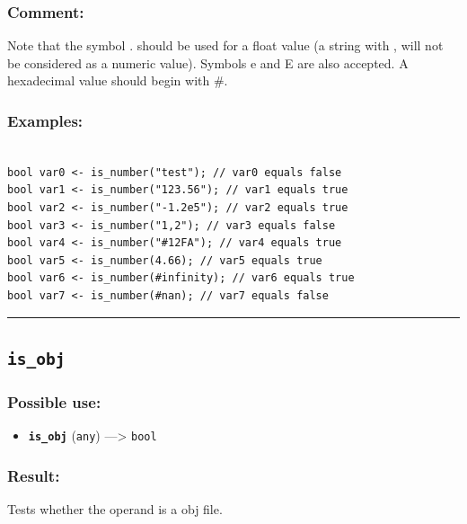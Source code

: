 \documentclass[]{book}
\providecommand{\tightlist}{%
  \setlength{\itemsep}{0pt}\setlength{\parskip}{0pt}}
\theoremstyle{definition}
\theoremstyle{definition}
\theoremstyle{definition}
\theoremstyle{remark}
\begin{document}
\subsubsection{Comment:}\label{comment-55}

Note that the symbol . should be used for a float value (a string with ,
will not be considered as a numeric value). Symbols e and E are also
accepted. A hexadecimal value should begin with \#.

\subsubsection{Examples:}\label{examples-216}

\begin{verbatim}
 
bool var0 <- is_number("test"); // var0 equals false 
bool var1 <- is_number("123.56"); // var1 equals true 
bool var2 <- is_number("-1.2e5"); // var2 equals true 
bool var3 <- is_number("1,2"); // var3 equals false 
bool var4 <- is_number("#12FA"); // var4 equals true 
bool var5 <- is_number(4.66); // var5 equals true 
bool var6 <- is_number(#infinity); // var6 equals true 
bool var7 <- is_number(#nan); // var7 equals false
\end{verbatim}

\begin{center}\rule{0.5\linewidth}{\linethickness}\end{center}

\subsection{\texorpdfstring{\texttt{is\_obj}}{is\_obj}}\label{is_obj}

\subsubsection{Possible use:}\label{possible-use-297}

\begin{itemize}
\tightlist
\item
  \textbf{\texttt{is\_obj}} (\texttt{any}) ---\textgreater{}
  \texttt{bool}
\end{itemize}

\subsubsection{Result:}\label{result-287}

Tests whether the operand is a obj file.
\end{document}

